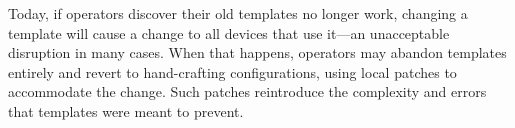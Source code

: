 \documentclass[numbers, 10pt, preprint]{sigplanconf}
\newcommand{\IE}{\emph{i.e.}}
\begin{document}

Today, if operators discover their old templates no longer work, changing a template will
cause a change to all devices that use it---an unacceptable disruption in many cases.  When that happens, operators may abandon templates entirely and revert to hand-crafting configurations, using local patches to accommodate the change.
Such patches reintroduce the complexity and errors that templates were meant to prevent.





\end{document}
